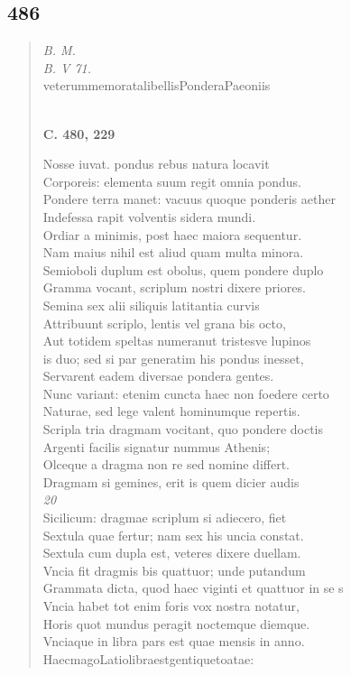 \documentclass[11pt, a4paper]{report}
\begin{document}
            \subsection*{486}
      \begin{verse}
      \textit{B. M.} \\ \textit{B. V 71.} \\ veterummemoratalibellisPonderaPaeoniis \\ 
        ﻿\pagebreak 
     \marginpar{[30]} \begin{center} \textbf{C. 480, 229} \end{center}Nosse iuvat. pondus rebus natura locavit \\ Corporeis: elementa suum regit omnia pondus. \\ Pondere terra manet: vacuus quoque ponderis aether \\ Indefessa rapit volventis sidera mundi. \\ Ordiar a minimis, post haec maiora sequentur. \\ Nam maius nihil est aliud quam multa minora. \\ Semioboli duplum est obolus, quem pondere duplo \\ Gramma vocant, scriplum nostri dixere priores. \\ Semina sex alii siliquis latitantia curvis \\ Attribuunt scriplo, lentis vel grana bis octo, \\ Aut totidem speltas numeranut tristesve lupinos \\ is duo; sed si par generatim his pondus inesset, \\ Servarent eadem diversae pondera gentes. \\ Nunc variant: etenim cuncta haec non foedere certo \\ Naturae, sed lege valent hominumque repertis. \\ Scripla tria dragmam vocitant, quo pondere doctis \\ Argenti facilis signatur nummus Athenis; \\ Olceque a dragma non re sed nomine differt. \\ Dragmam si gemines, erit is quem dicier audis \\ \textit{20} \\ Sicilicum: dragmae scriplum si adiecero, fiet \\ Sextula quae fertur; nam sex his uncia constat. \\ Sextula cum dupla est, veteres dixere duellam. \\ Vncia fit dragmis bis quattuor; unde putandum \\ Grammata dicta, quod haec viginti et quattuor in se s \\ Vncia habet tot enim foris vox nostra notatur, \\ Horis quot mundus peragit noctemque diemque. \\ Vnciaque in libra pars est quae mensis in anno. \\ HaecmagoLatiolibraestgentiquetoatae: \\ 

\end{verse}
\end{document}
